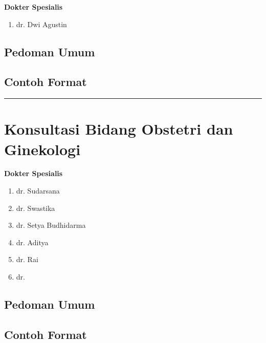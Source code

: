 \documentclass[
]{book}
\providecommand{\tightlist}{%
  \setlength{\itemsep}{0pt}\setlength{\parskip}{0pt}}
\begin{document}
\textbf{Dokter Spesialis}

\begin{enumerate}
\def\labelenumi{\arabic{enumi}.}
\tightlist
\item
  dr. Dwi Agustin
\end{enumerate}

\hypertarget{pedoman-umum-6}{%
\subsection{Pedoman Umum}\label{pedoman-umum-6}}

\hypertarget{contoh-format-6}{%
\subsection{Contoh Format}\label{contoh-format-6}}

\begin{center}\rule{0.5\linewidth}{0.5pt}\end{center}

\hypertarget{konsultasi-bidang-obstetri-dan-ginekologi}{%
\section{Konsultasi Bidang Obstetri dan Ginekologi}\label{konsultasi-bidang-obstetri-dan-ginekologi}}

\textbf{Dokter Spesialis}

\begin{enumerate}
\def\labelenumi{\arabic{enumi}.}
\tightlist
\item
  dr. Sudarsana
\item
  dr. Swastika
\item
  dr. Setya Budhidarma
\item
  dr. Aditya
\item
  dr. Rai
\item
  dr.
\end{enumerate}

\hypertarget{pedoman-umum-7}{%
\subsection{Pedoman Umum}\label{pedoman-umum-7}}

\hypertarget{contoh-format-7}{%
\subsection{Contoh Format}\label{contoh-format-7}}
\end{document}
